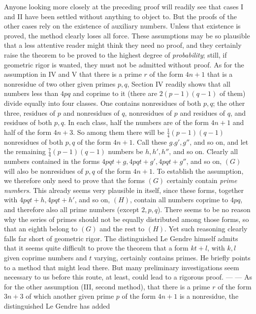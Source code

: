 Anyone looking more closely at the preceding proof will readily see
that cases I and II have been settled without anything to object to.
But the proofs of the other cases rely on the existence of auxiliary
numbers. Unless that existence is proved, the method clearly loses
all force. These assumptions may be so plausible that a less attentive
reader might think they need no proof, and they certainly raise the
theorem to be proved to the highest degree of \emph{probability};
still, if geometric rigor is wanted, they must not be admitted without
proof. As for the assumption in IV and V that there is a prime \(r\)
of the form \(4n+1\) that is a nonresidue of two other given primes
\(p,q\), Section IV readily shows that all numbers less than \(4pq\)
and coprime to it (there are \(2(p-1)(q-1)\) of them) divide equally into four
classes. One contains nonresidues of both \(p,q\); the other three,
residues of \(p\) and nonresidues of \(q\), nonresidues of \(p\)
and residues of \(q\), and residues of both \(p,q\). In each class,
half the numbers are of the form \(4n+1\) and half of the form \(4n+3\).
So among them there will be \(\frac14(p-1)(q-1)\) nonresidues of both \(p,q\)
of the form \(4n+1\). Call these \(g.g',g''\), and so on, and let the
remaining \(\frac74(p-1)(q-1)\) numbers be \(h,h',h''\), and so on. Clearly all numbers
contained in the forms \(4pqt+g,4pqt+g',4pqt+g''\), and so on, \((G)\) will also be
nonresidues of \(p,q\) of the form \(4n+1\). To establish the assumption,
we therefore only need to prove that the forms \((G)\) certainly
contain \emph{prime numbers}. This already seems very plausible
in itself, since these forms, together with \(4pqt+h,4pqt+h'\), and so on,
\((H)\), contain all numbers coprime to \(4pq\), and therefore
also all prime numbers (except \(2,p,q\)). There seems to be no reason
why the series of primes should not be equally distributed among
those forms, so that an eighth belong to \((G)\) and the rest to
\((H)\). Yet such reasoning clearly falls far short of geometric
rigor. The distinguished Le Gendre himself admits that it seems
quite difficult to prove the theorem that a form \(kt+l\), with
\(k,l\) given coprime numbers and \(t\) varying, certainly contains
primes. He briefly points to a method that might lead there. But
many preliminary investigations seem necessary to us before this
route, at least, could lead to a rigorous proof. — — As for the
other assumption (III, second method), that there is a prime \(r\)
of the form \(3n+3\) of which another given prime \(p\) of the form
\(4n+1\) is a nonresidue, the distinguished Le Gendre has added
